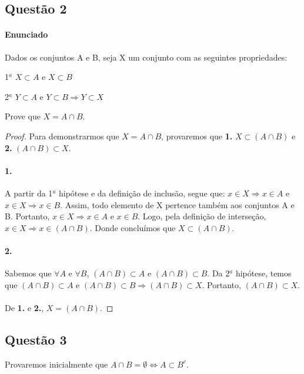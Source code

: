 \documentclass[11pt,a4paper]{report}
\begin{document}
    \subsection{Questão 2}
    \paragraph{Enunciado}
    Dados os conjuntos A e B, seja X um conjunto com as seguintes propriedades:

    1$^{a}$ $X \subset A$ e $X \subset B$

    2$^{a}$ $Y \subset A$ e $Y \subset B \Rightarrow Y \subset X$
    
    Prove que $X = A \cap B$.
    \begin{proof}
    Para demonstrarmos que $X = A \cap B$, provaremos que \textbf{1.} $X \subset (A \cap B)$ e \textbf{2.} $(A \cap B) \subset X$.

    \paragraph{1.}
    A partir da 1$^a$ hipótese e da definição de inclusão, segue que: $x \in X \Rightarrow x \in A$ e $x \in X \Rightarrow x \in B$. Assim, todo elemento de X pertence também aos conjuntos A e B. Portanto, $x \in X \Rightarrow x \in A$ e $x \in B$. Logo, pela definição de interseção, $x \in X \Rightarrow x \in (A\cap B)$. Donde concluímos que $X \subset (A \cap B)$.

    \paragraph{2.}
    Sabemos que $\forall A$ e $\forall B$, $(A \cap B) \subset A$ e $(A \cap B) \subset B$. Da 2$^{a}$ hipótese, temos que $(A \cap B) \subset A$ e $(A \cap B) \subset B \Rightarrow (A \cap B) \subset X$. Portanto, $(A \cap B) \subset X$.

    \paragraph{}
    De \textbf{1.} e \textbf{2.}, $X = (A \cap B)$.
    \end{proof}


    \subsection{Questão 3}
    Provaremos inicialmente que $A \cap B = \emptyset \Leftrightarrow A \subset B^c$.
\end{document}
